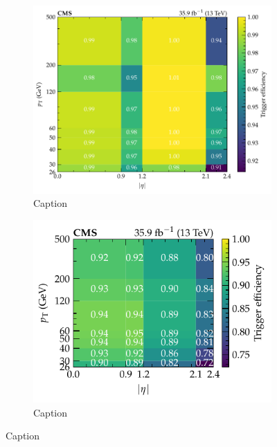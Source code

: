 \begin{figure}[htbp]
    \centering
    \begin{subfigure}[b]{0.49\textwidth}
        \centering
        \includegraphics{chapters/041_corrections/images/efficiencies/triggers/muons/muon_RunBCDEF_trigger_efficiency.pdf}
        \caption{Caption}
        \label{subfiga:}
    \end{subfigure}
    \hfill
    \begin{subfigure}[b]{0.49\textwidth}
        \centering
        \includegraphics{chapters/041_corrections/images/efficiencies/triggers/muons/muon_RunGH_trigger_efficiency.pdf}
        \caption{Caption}
        \label{subfiga:}
    \end{subfigure}
    \caption{Caption}
    \label{fig:muon-trigger-efficiency}
\end{figure}

